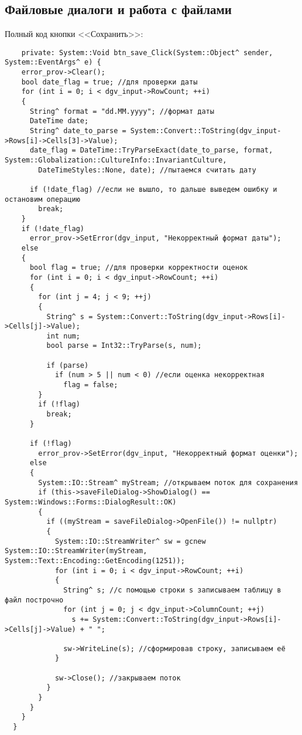 \subsection*{Файловые диалоги и работа с файлами}
Полный код кнопки <<Сохранить>>:
\begin{verbatim}
    private: System::Void btn_save_Click(System::Object^ sender, System::EventArgs^ e) {
    error_prov->Clear();
    bool date_flag = true; //для проверки даты
    for (int i = 0; i < dgv_input->RowCount; ++i)
    {
      String^ format = "dd.MM.yyyy"; //формат даты
      DateTime date; 
      String^ date_to_parse = System::Convert::ToString(dgv_input->Rows[i]->Cells[3]->Value);
      date_flag = DateTime::TryParseExact(date_to_parse, format, System::Globalization::CultureInfo::InvariantCulture,
        DateTimeStyles::None, date); //пытаемся считать дату

      if (!date_flag) //если не вышло, то дальше выведем ошибку и остановим операцию
        break;
    }
    if (!date_flag)
      error_prov->SetError(dgv_input, "Некорректный формат даты");
    else
    {
      bool flag = true; //для проверки корректности оценок
      for (int i = 0; i < dgv_input->RowCount; ++i)
      {
        for (int j = 4; j < 9; ++j)
        {
          String^ s = System::Convert::ToString(dgv_input->Rows[i]->Cells[j]->Value);
          int num;
          bool parse = Int32::TryParse(s, num);

          if (parse)
            if (num > 5 || num < 0) //если оценка некорректная
              flag = false;
        }
        if (!flag)
          break;
      }

      if (!flag)
        error_prov->SetError(dgv_input, "Некорректный формат оценки");
      else
      {
        System::IO::Stream^ myStream; //открываем поток для сохранения
        if (this->saveFileDialog->ShowDialog() == System::Windows::Forms::DialogResult::OK)
        {
          if ((myStream = saveFileDialog->OpenFile()) != nullptr)
          {
            System::IO::StreamWriter^ sw = gcnew System::IO::StreamWriter(myStream, System::Text::Encoding::GetEncoding(1251));
            for (int i = 0; i < dgv_input->RowCount; ++i)
            {
              String^ s; //с помощью строки s записываем таблицу в файл построчно
              for (int j = 0; j < dgv_input->ColumnCount; ++j)
                s += System::Convert::ToString(dgv_input->Rows[i]->Cells[j]->Value) + " ";

              sw->WriteLine(s); //сформировав строку, записываем её
            }

            sw->Close(); //закрываем поток
          }
        }
      }
    }
  }
\end{verbatim}

